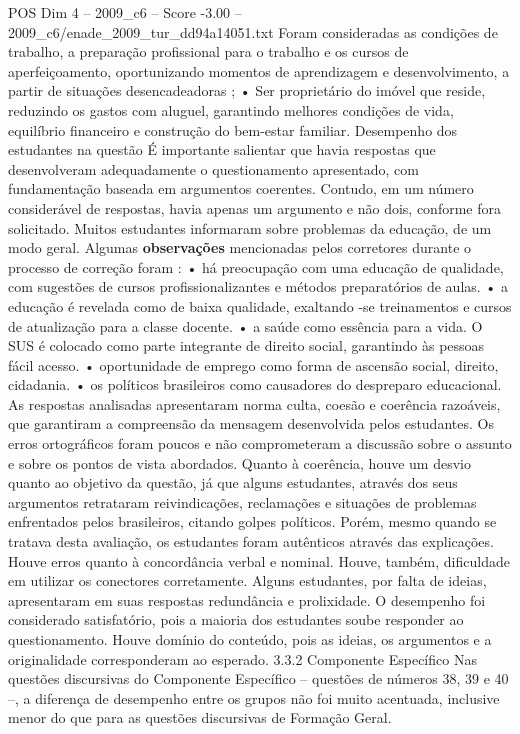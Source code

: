 \begin{textsample}{POS Dim 4 – 2009\_c6 – Score -3.00 – 2009\_c6/enade\_2009\_tur\_dd94a14051.txt}
Foram consideradas as condições de trabalho, a preparação profissional para o trabalho e os cursos de aperfeiçoamento, oportunizando momentos de aprendizagem e desenvolvimento, a partir de situações desencadeadoras ; • Ser proprietário do imóvel que reside, reduzindo os gastos com aluguel, garantindo melhores condições de vida, equilíbrio financeiro e construção do bem-estar familiar.
Desempenho dos estudantes na questão É importante salientar que havia respostas que desenvolveram adequadamente o questionamento apresentado, com fundamentação baseada em argumentos coerentes.
Contudo, em um número considerável de respostas, havia apenas um argumento e não dois, conforme fora solicitado.
Muitos estudantes informaram sobre problemas da educação, de um modo geral.
Algumas \textbf{observações} mencionadas pelos corretores durante o processo de correção foram : • há preocupação com uma educação de qualidade, com sugestões de cursos profissionalizantes e métodos preparatórios de aulas. • a educação é revelada como de baixa qualidade, exaltando -se treinamentos e cursos de atualização para a classe docente. • a saúde como essência para a vida.
O SUS é colocado como parte integrante de direito social, garantindo às pessoas fácil acesso. • oportunidade de emprego como forma de ascensão social, direito, cidadania. • os políticos brasileiros como causadores do despreparo educacional.
As respostas analisadas apresentaram norma culta, coesão e coerência razoáveis, que garantiram a compreensão da mensagem desenvolvida pelos estudantes.
Os erros ortográficos foram poucos e não comprometeram a discussão sobre o assunto e sobre os pontos de vista abordados.
Quanto à coerência, houve um desvio quanto ao objetivo da questão, já que alguns estudantes, através dos seus argumentos retrataram reivindicações, reclamações e situações de problemas enfrentados pelos brasileiros, citando golpes políticos.
Porém, mesmo quando se tratava desta avaliação, os estudantes foram autênticos através das explicações.
Houve erros quanto à concordância verbal e nominal.
Houve, também, dificuldade em utilizar os conectores corretamente.
Alguns estudantes, por falta de ideias, apresentaram em suas respostas redundância e prolixidade.
O desempenho foi considerado satisfatório, pois a maioria dos estudantes soube responder ao questionamento.
Houve domínio do conteúdo, pois as ideias, os argumentos e a originalidade corresponderam ao esperado. 3.3.2 Componente Específico Nas questões discursivas do Componente Específico – questões de números 38, 39 e 40 –, a diferença de desempenho entre os grupos não foi muito acentuada, inclusive menor do que para as questões discursivas de Formação Geral.

\end{textsample}
